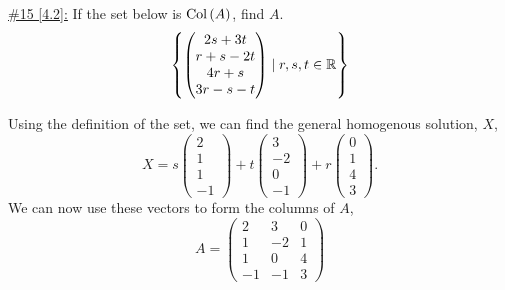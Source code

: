 \documentclass{exam}
\begin{document}
\underline{\#15 [4.2]:} If the set below is $\text{Col}\left(A\right)$, find $A$. 
\[
    \left\{
        \begin{pmatrix}
            2s + 3t \\ 
            r + s - 2t \\
            4r + s \\
            3r - s - t
        \end{pmatrix}
        \mid
        r, s, t \in \mathbb R
     \right\}
\]
\begin{solution}
    Using the definition of the set, we can find the general homogenous solution, $X$, 
    \[
        X = s\begin{pmatrix}
            2 \\ 1 \\ 1 \\ -1
        \end{pmatrix} 
        + t\begin{pmatrix}
            3 \\ -2 \\ 0 \\ -1
        \end{pmatrix}
        + r\begin{pmatrix}
            0 \\ 1 \\ 4 \\ 3
        \end{pmatrix}.
    \]
    We can now use these vectors to form the columns of $A$, 
    \[
        A = \begin{pmatrix}
            2 & 3 & 0 \\
            1 & -2 & 1 \\
            1 & 0 & 4 \\
            -1 & -1 & 3
        \end{pmatrix}
    \]
\end{solution}
\end{document}
